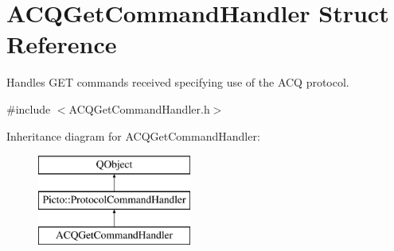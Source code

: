 \hypertarget{struct_a_c_q_get_command_handler}{\section{A\-C\-Q\-Get\-Command\-Handler Struct Reference}
\label{struct_a_c_q_get_command_handler}
}


Handles G\-E\-T commands received specifying use of the A\-C\-Q protocol.  




{\ttfamily \#include $<$A\-C\-Q\-Get\-Command\-Handler.\-h$>$}

Inheritance diagram for A\-C\-Q\-Get\-Command\-Handler\-:\begin{figure}[H]
\begin{center}
\leavevmode
\includegraphics[height=3.000000cm]{struct_a_c_q_get_command_handler}
\end{center}
\end{figure}
